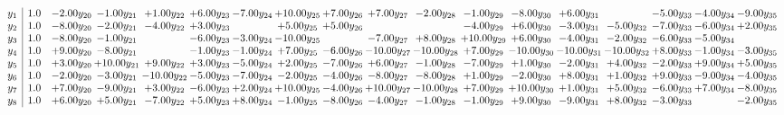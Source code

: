 \documentclass[9pt]{article}
\begin{document}
\[\begin{array}{c| c c@{\hskip 2pt} c@{\hskip 2pt} c@{\hskip 2pt} c@{\hskip 2pt} c@{\hskip 2pt} c@{\hskip 2pt} c@{\hskip 2pt} c@{\hskip 2pt} c@{\hskip 2pt} c@{\hskip 2pt} c@{\hskip 2pt} c@{\hskip 2pt} c@{\hskip 2pt} c@{\hskip 2pt} c@{\hskip 2pt} c@{\hskip 2pt} }
 y_{1}   &  1.0 & -2.00 y_{20} & -1.00 y_{21} & +  1.00 y_{22} & +  6.00 y_{23} & -7.00 y_{24} & + 10.00 y_{25} & +  7.00 y_{26} & +  7.00 y_{27} & -2.00 y_{28} & -1.00 y_{29} & -8.00 y_{30} & +  6.00 y_{31} &   & -5.00 y_{33} & -4.00 y_{34} & -9.00 y_{35}\\
 y_{2}   &  1.0 & -8.00 y_{20} & -2.00 y_{21} & -4.00 y_{22} & +  3.00 y_{23} &   & +  5.00 y_{25} & +  5.00 y_{26} &    &   & -4.00 y_{29} & +  6.00 y_{30} & -3.00 y_{31} & -5.00 y_{32} & -7.00 y_{33} & -6.00 y_{34} & +  2.00 y_{35}\\
 y_{3}   &  1.0 & -8.00 y_{20} & -1.00 y_{21} &   & -6.00 y_{23} & -3.00 y_{24} & -10.00 y_{25} &   & -7.00 y_{27} & +  8.00 y_{28} & + 10.00 y_{29} & +  6.00 y_{30} & -4.00 y_{31} & -2.00 y_{32} & -6.00 y_{33} & -5.00 y_{34} &   \\
 y_{4}   &  1.0 & +  9.00 y_{20} & -8.00 y_{21} &   & -1.00 y_{23} & -1.00 y_{24} & +  7.00 y_{25} & -6.00 y_{26} & -10.00 y_{27} & -10.00 y_{28} & +  7.00 y_{29} & -10.00 y_{30} & -10.00 y_{31} & -10.00 y_{32} & +  8.00 y_{33} & -1.00 y_{34} & -3.00 y_{35}\\
 y_{5}   &  1.0 & +  3.00 y_{20} & + 10.00 y_{21} & +  9.00 y_{22} & +  3.00 y_{23} & -5.00 y_{24} & +  2.00 y_{25} & -7.00 y_{26} & +  6.00 y_{27} & -1.00 y_{28} & -7.00 y_{29} & +  1.00 y_{30} & -2.00 y_{31} & +  4.00 y_{32} & -2.00 y_{33} & +  9.00 y_{34} & +  5.00 y_{35}\\
 y_{6}   &  1.0 & -2.00 y_{20} & -3.00 y_{21} & -10.00 y_{22} & -5.00 y_{23} & -7.00 y_{24} & -2.00 y_{25} & -4.00 y_{26} & -8.00 y_{27} & -8.00 y_{28} & +  1.00 y_{29} & -2.00 y_{30} & +  8.00 y_{31} & +  1.00 y_{32} & +  9.00 y_{33} & -9.00 y_{34} & -4.00 y_{35}\\
 y_{7}   &  1.0 & +  7.00 y_{20} & -9.00 y_{21} & +  3.00 y_{22} & -6.00 y_{23} & +  2.00 y_{24} & + 10.00 y_{25} & -4.00 y_{26} & + 10.00 y_{27} & -10.00 y_{28} & +  7.00 y_{29} & + 10.00 y_{30} & +  1.00 y_{31} & +  5.00 y_{32} & -6.00 y_{33} & +  7.00 y_{34} & -8.00 y_{35}\\
 y_{8}   &  1.0 & +  6.00 y_{20} & +  5.00 y_{21} & -7.00 y_{22} & +  5.00 y_{23} & +  8.00 y_{24} & -1.00 y_{25} & -8.00 y_{26} & -4.00 y_{27} & -1.00 y_{28} & -1.00 y_{29} & +  9.00 y_{30} & -9.00 y_{31} & +  8.00 y_{32} & -3.00 y_{33} &   & -2.00 y_{35}\\

\end{array}\]
\end{document}
